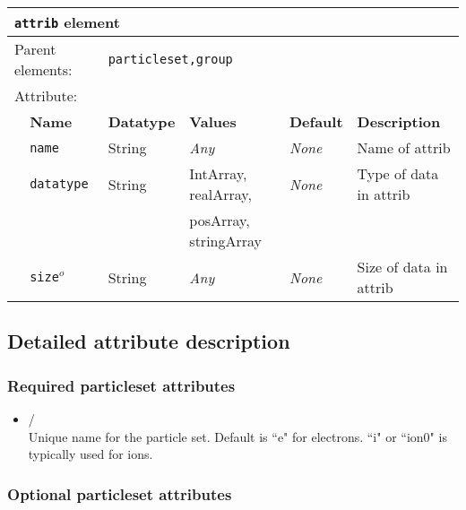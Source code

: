 \begin{table}[h]
\begin{center}
\begin{tabularx}{\textwidth}{l l l l l X }
\hline
\multicolumn{6}{l}{\texttt{attrib} element} \\
\hline
\multicolumn{2}{l}{Parent elements:} & \multicolumn{4}{l}{\texttt{particleset,group}}\\
\multicolumn{2}{l}{Attribute:} & \multicolumn{4}{l}{}\\
   &   \bfseries Name            & \bfseries Datatype & \bfseries Values & \bfseries Default   & \bfseries Description \\
   &   \texttt{name}             &  String            &  \textit{Any}    &  \textit{None}    & Name of attrib              \\
   &   \texttt{datatype}         &  String            &  IntArray, realArray, &  \textit{None} & Type of data in attrib \\
   &                             &                    &  posArray, stringArray &             &                        \\
   &   \texttt{size}$^o$         &  String            &  \textit{Any}    &  \textit{None}    & Size of data in attrib \\
  \hline
  \hline
\end{tabularx}
\end{center}
\end{table}

\subsection{Detailed attribute description}

\subsubsection{Required particleset attributes}

\begin{itemize}
\item {}/ \\
Unique name for the particle set. Default is ``e" for electrons. ``i" or ``ion0" is typically used for ions. 
\end{itemize}

\subsubsection{Optional particleset attributes}

